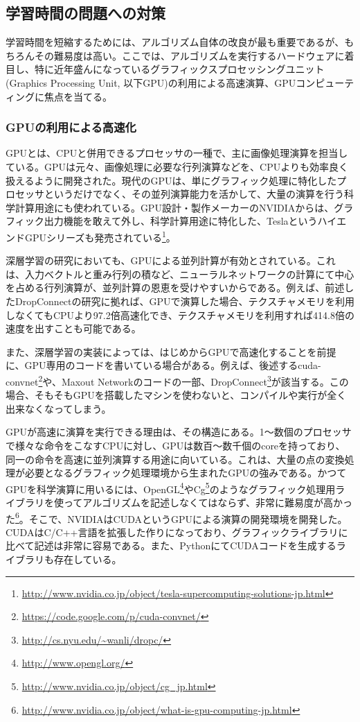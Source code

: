 \subsection{学習時間の問題への対策}
学習時間を短縮するためには、アルゴリズム自体の改良が最も重要であるが、もちろんその難易度は高い。ここでは、アルゴリズムを実行するハードウェアに着目し、特に近年盛んになっているグラフィックスプロセッシングユニット(Graphics Processing Unit, 以下GPU)の利用による高速演算、GPUコンピューティングに焦点を当てる。
\subsubsection{GPUの利用による高速化}
GPUとは、CPUと併用できるプロセッサの一種で、主に画像処理演算を担当している。GPUは元々、画像処理に必要な行列演算などを、CPUよりも効率良く扱えるように開発された。現代のGPUは、単にグラフィック処理に特化したプロセッサというだけでなく、その並列演算能力を活かして、大量の演算を行う科学計算用途にも使われている。GPU設計・製作メーカーのNVIDIAからは、グラフィック出力機能を敢えて外し、科学計算用途に特化した、TeslaというハイエンドGPUシリーズも発売されている\footnote{\url{http://www.nvidia.co.jp/object/tesla-supercomputing-solutions-jp.html}}。\par 
深層学習の研究においても、GPUによる並列計算が有効とされている。これは、入力ベクトルと重み行列の積など、ニューラルネットワークの計算にて中心を占める行列演算が、並列計算の恩恵を受けやすいからである\cite{bengio2012practical}。例えば、前述したDropConnectの研究\cite{wan2013regularization}に拠れば、GPUで演算した場合、テクスチャメモリを利用しなくてもCPUより97.2倍高速化でき、テクスチャメモリを利用すれば414.8倍の速度を出すことも可能である。\par
また、深層学習の実装によっては、はじめからGPUで高速化することを前提に、GPU専用のコードを書いている場合がある。例えば、後述するcuda-convnet\footnote{\url{https://code.google.com/p/cuda-convnet/}}や、Maxout Network\cite{goodfellow2013maxout}のコードの一部、DropConnect\cite{wan2013regularization}\footnote{\url{http://cs.nyu.edu/~wanli/dropc/}}が該当する。この場合、そもそもGPUを搭載したマシンを使わないと、コンパイルや実行が全く出来なくなってしまう。\par
GPUが高速に演算を実行できる理由は、その構造にある。1〜数個のプロセッサで様々な命令をこなすCPUに対し、GPUは数百〜数千個のcoreを持っており、同一の命令を高速に並列演算する用途に向いている。これは、大量の点の変換処理が必要となるグラフィック処理環境から生まれたGPUの強みである。かつてGPUを科学演算に用いるには、OpenGL\footnote{\url{http://www.opengl.org/}}やCg\footnote{\url{http://www.nvidia.co.jp/object/cg_jp.html}}のようなグラフィック処理用ライブラリを使ってアルゴリズムを記述しなくてはならず、非常に難易度が高かった\footnote{\url{http://www.nvidia.co.jp/object/what-is-gpu-computing-jp.html}}。そこで、NVIDIAはCUDAというGPUによる演算の開発環境を開発した\cite{garland2008parallel}。CUDAはC/C++言語を拡張した作りになっており、グラフィックライブラリに比べて記述は非常に容易である。また、PythonにてCUDAコードを生成するライブラリも存在している\cite{klockner2009pycuda:}\cite{klockner2012pycuda}。\par
